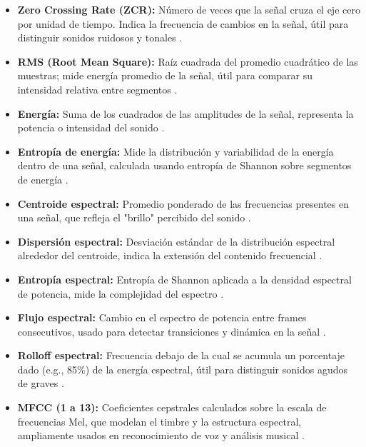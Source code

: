 \begin{itemize}
  \item \textbf{Zero Crossing Rate (ZCR):} Número de veces que la señal cruza el eje cero por unidad de tiempo. Indica la frecuencia de cambios en la señal, útil para distinguir sonidos ruidosos y tonales \cite{muller2015fmp}.

  \item \textbf{RMS (Root Mean Square):} Raíz cuadrada del promedio cuadrático de las muestras; mide energía promedio de la señal, útil para comparar su intensidad relativa entre segmentos \cite{sound_quality_heyboer2010}.

  \item \textbf{Energía:} Suma de los cuadrados de las amplitudes de la señal, representa la potencia o intensidad del sonido \cite{rabiner2010fundamentals}.

  \item \textbf{Entropía de energía:} Mide la distribución y variabilidad de la energía dentro de una señal, calculada usando entropía de Shannon sobre segmentos de energía \cite{li2017audio}.

  \item \textbf{Centroide espectral:} Promedio ponderado de las frecuencias presentes en una señal, que refleja el "brillo" percibido del sonido \cite{peeters2004large}.

  \item \textbf{Dispersión espectral:} Desviación estándar de la distribución espectral alrededor del centroide, indica la extensión del contenido frecuencial \cite{peeters2004large}.

  \item \textbf{Entropía espectral:} Entropía de Shannon aplicada a la densidad espectral de potencia, mide la complejidad del espectro \cite{jiang2011spectral}.

  \item \textbf{Flujo espectral:} Cambio en el espectro de potencia entre frames consecutivos, usado para detectar transiciones y dinámica en la señal \cite{foote2000novelty}.

  \item \textbf{Rolloff espectral:} Frecuencia debajo de la cual se acumula un porcentaje dado (e.g., 85\%) de la energía espectral, útil para distinguir sonidos agudos de graves \cite{tzanetakis2002musical}.

  \item \textbf{MFCC (1 a 13):} Coeficientes cepstrales calculados sobre la escala de frecuencias Mel, que modelan el timbre y la estructura espectral, ampliamente usados en reconocimiento de voz y análisis musical \cite{davis1980tassp}.
\end{itemize}


